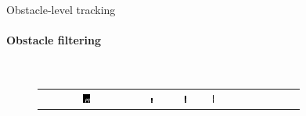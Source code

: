 \begin{frame}{Obstacle-level tracking}
  \framesubtitle{Obstacle filtering}

  \begin{figure}
    \begin{minipage}{\textwidth}
      \centering
    \end{minipage}\hfill~
    \begin{minipage}{\textwidth}
      \centering
      \begin{tabular}{ |c|c|c|c|c|c|c|c|c|c|c|}
	\hline
	\includegraphics[width=0.075\textwidth, height=0.075\textwidth]{obstacleFilter/roi0} &
	\includegraphics[width=0.075\textwidth, height=0.075\textwidth]{obstacleFilter/roi1} &
	\includegraphics[width=0.075\textwidth, height=0.075\textwidth]{obstacleFilter/roi2} &
	\includegraphics[width=0.075\textwidth, height=0.075\textwidth]{obstacleFilter/roi3} &

\end{tabular}
\end{minipage}
\end{figure}
\end{frame}
